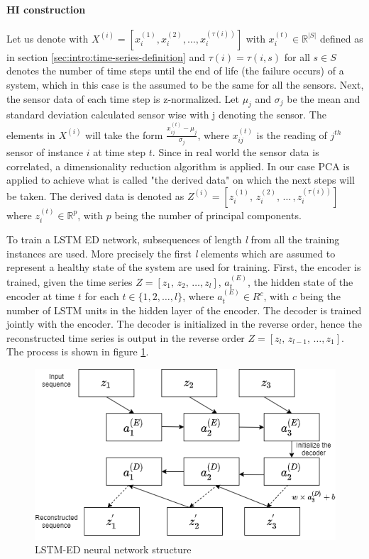 \paragraph{HI construction}
Let us denote with $X^{(i)} = [x_i^{(1)} ,  x_i^{(2)} , \dots , x_{i}^{(\tau(i))}]$ with $x_i^{(t)} \in \mathbb{R}^{|S|}$ defined as in section
\ref{sec:intro:time-series-definition}
and $\tau(i) = \tau(i,s)$ for all $s \in S$ denotes the number of time steps until the end of life (the failure occurs) of
a system, which in this case is the assumed
to be the same for all the sensors. Next, the sensor data of each time step is z-normalized.
Let $\mu_j$ and $\sigma_j$ be the mean and standard deviation calculated sensor wise with j denoting the sensor. The
elements in  $X^{(i)}$ will take the form $\frac{x^{(t)}_{ij}-\mu_j}{\sigma_j}$, where $x^{(t)}_{ij}$ is the reading of $j^{th}$ sensor
of instance $i$ at time step $t$. Since in real world the sensor data is correlated, a
dimensionality reduction algorithm is applied. In our case PCA is applied to achieve what is called "the derived data" on
which the next steps will be taken. The derived data is denoted as $Z^{(i)} = [z_i^{(1)}, \,  z_i^{(2)}, \, \dots \, ,z_{i}^{(\tau(i))}]$ where
$z_i^{(t)} \in \mathbb{R}^p$, with $p$ being the number of principal components.

To train a LSTM ED network, subsequences of length \emph{l} from all the training instances are used. More precisely the first \emph{l} elements which
are assumed to represent a healthy state of the system are used for training.
First, the encoder is trained, given the time series
$Z = [z_1, \,  z_2, \, \dots ,z_l]$, $a_t^{(E)}$, the hidden state of the encoder at time $t$ for each $t \in \{1,2,\dots,l\}$, where
$a_t^{(E)}\in R^c$, with $c$ being the number of LSTM units in the hidden layer of the encoder. The decoder is trained jointly with
the encoder. The decoder is initialized in the reverse order, hence the reconstructed time series is output in the reverse order $Z = [z_l, \,  z_{l-1}, \, \dots ,z_1]$. The process is shown in figure \ref{fig:LSTM_inference}.

\begin{figure}[ht]
    \centering
    \includegraphics[scale=0.6]{gfx/LSTM_ED_inference}
    \captionsetup{justification=centering}
    \caption{LSTM-ED neural network structure
        \cite{DBLP:journals/corr/MalhotraTRAVAS16}}
    \label{fig:LSTM_inference}
\end{figure}

